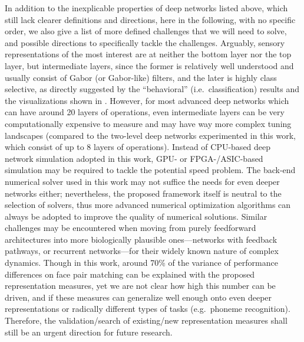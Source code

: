 In addition to the inexplicable properties of deep networks listed above, which still lack clearer definitions and directions, here in the following, with no specific order, we also give a list of more defined challenges that we will need to solve, and possible directions to specifically tackle the challenges. Arguably, sensory representations of the most interest are at neither the bottom layer nor the top layer, but intermediate layers, since the former is relatively well understood and usually consist of Gabor (or Gabor-like) filters, and the later is highly class selective, as directly suggested by the ``behavioral'' (i.e.~classification) results and the visualizations shown in \cite{donahue2014decaf, azizpour2014generic}. However, for most advanced deep networks \cite{szegedy2014going, simonyan2014very} which can have around 20 layers of operations, even intermediate layers can be very computationally expensive to measure and may have way more complex tuning landscapes (compared to the two-level deep networks experimented in this work, which consist of up to 8 layers of operations). Instead of CPU-based deep network simulation adopted in this work, GPU- or FPGA-/ASIC-based simulation may be required to tackle the potential speed problem. The back-end numerical solver used in this work may not suffice the needs for even deeper networks either; nevertheless, the proposed framework itself is neutral to the selection of solvers, thus more advanced numerical optimization algorithms can always be adopted to improve the quality of numerical solutions. Similar challenges may be encountered when moving from purely feedforward architectures into more biologically plausible ones---networks with feedback pathways, or recurrent networks---for their widely known nature of complex dynamics. Though in this work, around 70\% of the variance of performance differences on face pair matching can be explained with the proposed representation measures, yet we are not clear how high this number can be driven, and if these measures can generalize well enough onto even deeper representations or radically different types of tasks (e.g.~phoneme recognition). Therefore, the validation/search of existing/new representation measures shall still be an urgent direction for future research. 


